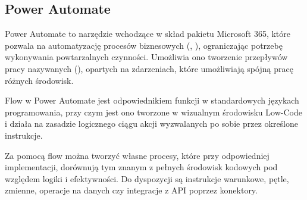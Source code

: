 \subsection{Power Automate}

Power Automate to narzędzie wchodzące w skład pakietu Microsoft 365, które pozwala na automatyzację procesów biznesowych (, ), ograniczając potrzebę wykonywania powtarzalnych czynności. Umożliwia ono tworzenie przepływów pracy nazywanych  (), opartych na zdarzeniach, które umożliwiają spójną pracę różnych środowisk.

Flow w Power Automate jest odpowiednikiem funkcji w standardowych językach programowania, przy czym jest ono tworzone w wizualnym środowisku Low-Code i działa na zasadzie logicznego ciągu akcji wyzwalanych po sobie przez określone instrukcje.

Za pomocą flow można tworzyć własne procesy, które przy odpowiedniej implementacji, dorównują tym znanym z pełnych środowisk kodowych pod względem logiki i efektywności. Do dyspozycji są instrukcje warunkowe, pętle, zmienne, operacje na danych czy integracje z API poprzez konektory.

